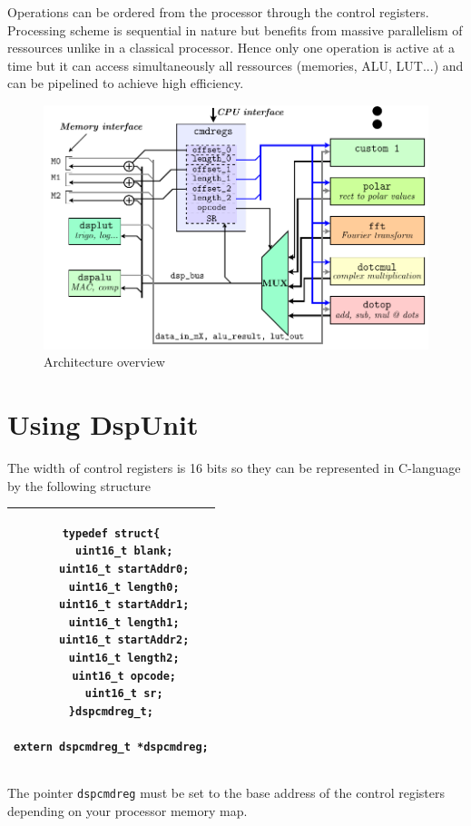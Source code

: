\documentclass[11pt]{article}
\begin{document}
Operations can be ordered from the processor through the control registers. Processing scheme is sequential in nature but benefits from massive parallelism of ressources unlike in a classical processor. Hence only one operation is active at a time but it can access simultaneously all ressources (memories, ALU, LUT...) and can be pipelined to achieve high efficiency.
\begin{figure}
 \centering
 \includegraphics{img/diagramm.pdf}
 \caption{Architecture overview}
\end{figure}

\section{Using DspUnit}

The width of control registers is 16 bits so they can be represented in C-language by the following structure

\begin{tabular}{|c|}
\hline
\begin{minipage}{0.5\textwidth}
\begin{verbatim}
typedef struct{
    uint16_t blank;
    uint16_t startAddr0;
    uint16_t length0;
    uint16_t startAddr1;
    uint16_t length1;
    uint16_t startAddr2;
    uint16_t length2;
    uint16_t opcode;
    uint16_t sr;
}dspcmdreg_t;

extern dspcmdreg_t *dspcmdreg;
\end{verbatim}
\end{minipage}
\\\hline
\end{tabular}


The pointer \texttt{dspcmdreg} must be set to the base address of the control registers depending on your processor memory map.
\end{document}
